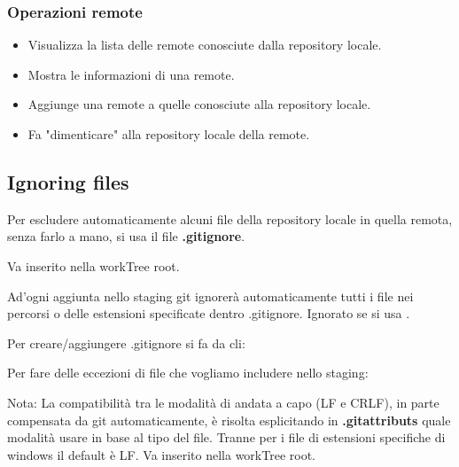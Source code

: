 \subsubsection{Operazioni remote}
\begin{itemize}
	\item Visualizza la lista delle remote conosciute dalla repository locale.


	\item Mostra le informazioni di una remote.


	\item Aggiunge una remote a quelle conosciute alla repository locale.


	\item Fa "dimenticare" alla repository locale della remote.


\end{itemize}

\subsection{Ignoring files}
Per escludere automaticamente alcuni file della repository locale in quella remota, senza farlo a mano, si usa il file \textbf{.gitignore}.

Va inserito nella workTree root.

Ad'ogni aggiunta nello staging git ignorerà automaticamente tutti i file nei percorsi o delle estensioni specificate dentro .gitignore. Ignorato se si usa .

Per creare/aggiungere .gitignore si fa da cli:


Per fare delle eccezioni di file che vogliamo includere nello staging:



Nota: La compatibilità tra le modalità di andata a capo (LF e CRLF), in parte compensata da git automaticamente, è risolta esplicitando in \textbf{.gitattributs} quale modalità usare in base al tipo del file. Tranne per i file di estensioni specifiche di windows il default è LF. Va inserito nella workTree root.

